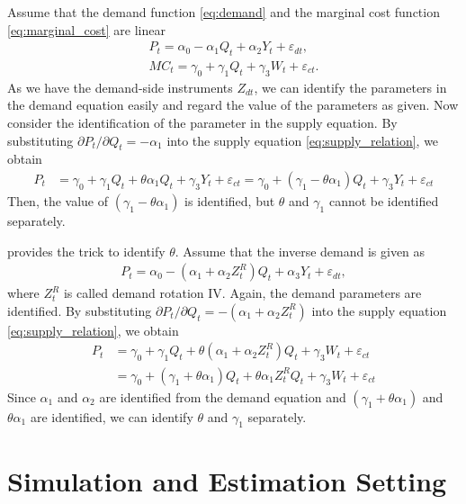 \documentclass[11pt, a4paper]{article}
\begin{document}
Assume that the demand function \eqref{eq:demand} and the marginal cost function \eqref{eq:marginal_cost} are linear
\begin{align}
    P_{t}=\alpha_0 - \alpha_1 Q_{t} + \alpha_2 Y_t + \varepsilon_{dt},\\
    MC_{t} = \gamma_0 + \gamma_1 Q_t + \gamma_3 W_t + \varepsilon_{ct}.
\end{align}
As we have the demand-side instruments $Z_{dt}$, we can identify the parameters in the demand equation easily and regard the value of the parameters as given.
Now consider the identification of the parameter in the supply equation.
By substituting $\partial P_t/\partial Q_t = - \alpha_1$ into the supply equation \eqref{eq:supply_relation}, we obtain
\begin{align}
    P_{t}&=\gamma_0+\gamma_1 Q_t + \theta\alpha_1 Q_t + \gamma_3 Y_t + \varepsilon_{ct} =\gamma_0+\left(\gamma_1- \theta\alpha_1\right) Q_t + \gamma_3 Y_t + \varepsilon_{ct} \nonumber
\end{align}
Then, the value of $(\gamma_1- \theta\alpha_1)$ is identified, but $\theta$ and $\gamma_1$ cannot be identified separately.

\cite{bresnahan1982oligopoly} provides the trick to identify $\theta$. 
Assume that the inverse demand is given as 
\begin{align}
    P_{t}=\alpha_0 - (\alpha_1+\alpha_2 Z^R_t) Q_{t} + \alpha_3 Y_t + \varepsilon_{dt},
\end{align}
where $Z^R_t$ is called demand rotation IV.
Again, the demand parameters are identified.
By substituting $\partial P_t/\partial Q_t = -(\alpha_1+\alpha_2 Z^R_t)$ into the supply equation \eqref{eq:supply_relation}, we obtain
\begin{align}
    P_{t}&=\gamma_0+\gamma_1 Q_t + \theta (\alpha_1+\alpha_2 Z^R_t) Q_t + \gamma_3 W_t + \varepsilon_{ct} \nonumber\\
    &= \gamma_0 + (\gamma_1 + \theta \alpha_1) Q_t + \theta\alpha_1 Z^R_tQ_t + \gamma_3 W_t + \varepsilon_{ct}   \nonumber
\end{align}
Since $\alpha_1$ and $\alpha_2$ are identified from the demand equation and $(\gamma_1 + \theta\alpha_1)$ and $\theta \alpha_1$ are identified, we can identify $\theta$ and $\gamma_1$ separately.



\section{Simulation and Estimation Setting}\label{sec:simulation_and_estimation_setting}
\end{document}
